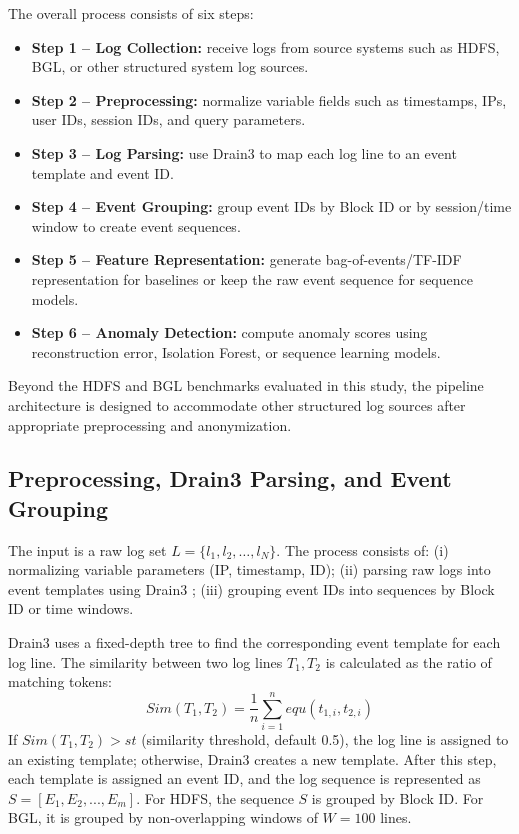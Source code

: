 \documentclass[conference]{IEEEtran}
\begin{document}
The overall process consists of six steps:
\begin{itemize}
    \item \textbf{Step 1 -- Log Collection:} receive logs from source systems such as HDFS, BGL, or other structured system log sources.
    \item \textbf{Step 2 -- Preprocessing:} normalize variable fields such as timestamps, IPs, user IDs, session IDs, and query parameters.
    \item \textbf{Step 3 -- Log Parsing:} use Drain3 to map each log line to an event template and event ID.
    \item \textbf{Step 4 -- Event Grouping:} group event IDs by Block ID or by session/time window to create event sequences.
    \item \textbf{Step 5 -- Feature Representation:} generate bag-of-events/TF-IDF representation for baselines or keep the raw event sequence for sequence models.
    \item \textbf{Step 6 -- Anomaly Detection:} compute anomaly scores using reconstruction error, Isolation Forest, or sequence learning models.
\end{itemize}

Beyond the HDFS and BGL benchmarks evaluated in this study, the pipeline architecture is designed to accommodate other structured log sources after appropriate preprocessing and anonymization.

\subsection{Preprocessing, Drain3 Parsing, and Event Grouping}
The input is a raw log set $L=\{l_1,l_2,\ldots,l_N\}$. The process consists of: (i) normalizing variable parameters (IP, timestamp, ID); (ii) parsing raw logs into event templates using Drain3 \cite{b3}; (iii) grouping event IDs into sequences by Block ID or time windows.

Drain3 uses a fixed-depth tree to find the corresponding event template for each log line. The similarity between two log lines $T_1, T_2$ is calculated as the ratio of matching tokens:
\begin{equation}
Sim(T_1, T_2) = \frac{1}{n} \sum_{i=1}^{n} equ(t_{1,i}, t_{2,i})
\label{eq_sim}
\end{equation}
If $Sim(T_1, T_2) > st$ (similarity threshold, default 0.5), the log line is assigned to an existing template; otherwise, Drain3 creates a new template. After this step, each template is assigned an event ID, and the log sequence is represented as $S = [E_1, E_2, ..., E_m]$.
For HDFS, the sequence $S$ is grouped by Block ID. For BGL, it is grouped by non-overlapping windows of $W{=}100$ lines.
\end{document}
